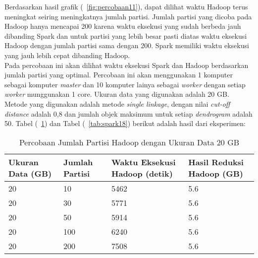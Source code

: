 Berdasarkan hasil grafik (~\ref{fig:percobaan11}), dapat dilihat waktu Hadoop terus meningkat seiring meningkatnya jumlah partisi. Jumlah partisi yang dicoba pada Hadoop hanya mencapai 200 karena waktu eksekusi yang sudah berbeda jauh dibanding Spark dan untuk partisi yang lebih besar pasti diatas waktu eksekusi Hadoop dengan jumlah partisi sama dengan 200. Spark memiliki waktu eksekusi yang jauh lebih cepat dibanding Hadoop.\\




Pada percobaan ini akan dilihat waktu eksekusi Spark dan Hadoop berdasarkan jumlah partisi yang optimal. Percobaan ini akan menggunakan 1 komputer sebagai komputer \textit{master} dan 10 komputer lainya sebagai \textit{worker} dengan setiap \textit{worker} munggunakan 1 core. Ukuran data yang digunakan adalah 20 GB. Metode yang digunakan adalah metode \textit{single linkage}, dengan nilai \textit{cut-off distance} adalah 0,8 dan jumlah objek maksimum untuk setiap \textit{dendrogram} adalah 50. Tabel (~\ref{tab:spark17}) dan Tabel (~\ref{tab:spark18}) berikut adalah hasil dari eksperimen:





\begin{table}[H] 
	\centering 
	\caption{Percobaan Jumlah Partisi Hadoop dengan Ukuran Data 20 GB}
	\label{tab:spark17}
	\begin{tabular}{|p{3cm}|p{3cm}|p{4cm}|p{4cm}|}
\hline
Ukuran Data (GB) & Jumlah Partisi &  Waktu Eksekusi Hadoop (detik) & Hasil Reduksi Hadoop (GB)\\
\hline
20 & 10 & 5462  & 5.6  \\
\hline
20 & 30 & 5771  & 5.6  \\
\hline
20 & 50 & 5914  & 5.6  \\
\hline
20 & 100 & 6240  & 5.6  \\
\hline
20 & 200 & 7508 & 5.6  \\
\hline


\hline

	\end{tabular} 
\end{table}





